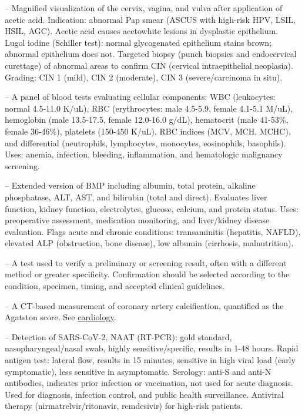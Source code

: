 -- Magnified visualization of the cervix, vagina, and vulva after application of acetic acid. Indication: abnormal Pap smear (ASCUS with high-risk HPV, LSIL, HSIL, AGC). Acetic acid causes acetowhite lesions in dysplastic epithelium. Lugol iodine (Schiller test): normal glycogenated epithelium stains brown; abnormal epithelium does not. Targeted biopsy (punch biopsies and endocervical curettage) of abnormal areas to confirm CIN (cervical intraepithelial neoplasia). Grading: CIN 1 (mild), CIN 2 (moderate), CIN 3 (severe/carcinoma in situ).

-- A panel of blood tests evaluating cellular components: WBC (leukocytes: normal 4.5-11.0 K/uL), RBC (erythrocytes: male 4.5-5.9, female 4.1-5.1 M/uL), hemoglobin (male 13.5-17.5, female 12.0-16.0 g/dL), hematocrit (male 41-53\%, female 36-46\%), platelets (150-450 K/uL), RBC indices (MCV, MCH, MCHC), and differential (neutrophils, lymphocytes, monocytes, eosinophils, basophils). Uses: anemia, infection, bleeding, inflammation, and hematologic malignancy screening.

-- Extended version of BMP including albumin, total protein, alkaline phosphatase, ALT, AST, and bilirubin (total and direct). Evaluates liver function, kidney function, electrolytes, glucose, calcium, and protein status. Uses: preoperative assessment, medication monitoring, and liver/kidney disease evaluation. Flags acute and chronic conditions: transaminitis (hepatitis, NAFLD), elevated ALP (obstruction, bone disease), low albumin (cirrhosis, malnutrition).

-- A test used to verify a preliminary or screening result, often with a different method or greater specificity. Confirmation should be selected according to the condition, specimen, timing, and accepted clinical guidelines.

-- A CT-based measurement of coronary artery calcification, quantified as the Agatston score. See \hyperlink{Cardiology}{cardiology}.

-- Detection of SARS-CoV-2. NAAT (RT-PCR): gold standard, nasopharyngeal/nasal swab, highly sensitive/specific, results in 1-48 hours. Rapid antigen test: lateral flow, results in 15 minutes, sensitive in high viral load (early symptomatic), less sensitive in asymptomatic. Serology: anti-S and anti-N antibodies, indicates prior infection or vaccination, not used for acute diagnosis. Used for diagnosis, infection control, and public health surveillance. Antiviral therapy (nirmatrelvir/ritonavir, remdesivir) for high-risk patients.

